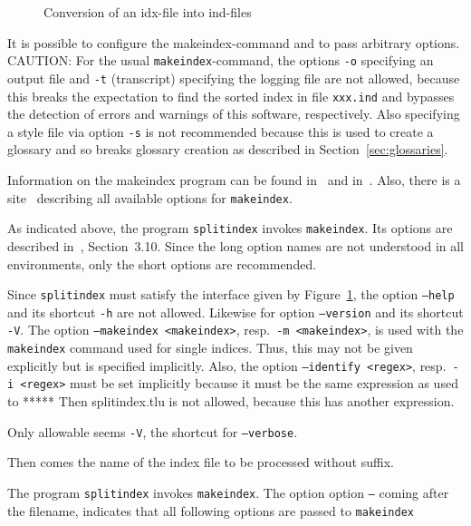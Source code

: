 \begin{figure}[htb]
\centering
{}
\caption{\label{fig:idx2indSplit}Conversion of an \gls{idx}-file into ind-files}
\end{figure}

It is possible to configure the makeindex-command 
and to pass arbitrary options. 
CAUTION\@: For the usual \texttt{makeindex}-command, 
the options \texttt{-o} specifying an output file 
and \texttt{-t} (transcript) specifying the logging file are not allowed, 
because this breaks the expectation to find the sorted index 
in file \texttt{xxx.ind} 
and bypasses the detection of errors and warnings of this software, 
respectively. 
Also specifying a style file via option \texttt{-s} 
is not recommended because this is used to create a glossary 
and so breaks glossary creation 
as described in Section~\ref{sec:glossaries}. 

Information on the makeindex program can be found in~\cite{MkIdxMoe} 
and in~\cite{MkIdxLam}. 
Also, there is a site~\cite{MakeIdxOpts} 
describing all available options for \texttt{makeindex}. 

As indicated above, the program \texttt{splitindex} 
invokes \texttt{makeindex}. 
Its options are described in~\cite{SplitidxP}, Section~3.10. 
Since the long option names are not understood in all environments, 
only the short options are recommended. 

Since \texttt{splitindex} must satisfy the interface 
given by Figure~\ref{fig:idx2indSplit}, 
the option \texttt{--help} and its shortcut \texttt{-h} are not allowed. 
Likewise for option \texttt{--version} and its shortcut \texttt{-V}. 
The option \texttt{--makeindex <makeindex>}, resp.~\texttt{-m <makeindex>}, 
is used with the \texttt{makeindex} command used for single indices. 
Thus, this may not be given explicitly but is specified implicitly. 
Also, the option \texttt{--identify <regex>}, resp.~\texttt{-i <regex>} 
must be set implicitly because it must be the same expression 
as used to ***** 
Then splitindex.tlu is not allowed, 
because this has another expression. 

Only allowable seems \texttt{-V}, the shortcut for \texttt{--verbose}. 

Then comes the name of the index file to be processed 
without suffix. 

The program \texttt{splitindex} invokes \texttt{makeindex}. 
The option option \texttt{--} coming after the filename, 
indicates that all following options are passed to \texttt{makeindex} 



